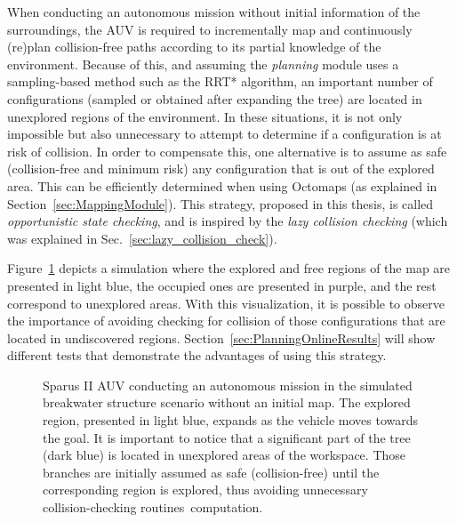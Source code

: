 When conducting an autonomous mission without initial information of the
surroundings, the \ac{AUV} is required to incrementally map and continuously
(re)plan collision-free paths according to its partial knowledge of the
environment. Because of this, and assuming the \textit{planning} module uses a
sampling-based method such as the \ac{RRT*} algorithm, an important number of
configurations (sampled or obtained after expanding the tree) are located in
unexplored regions of the environment. In these situations, it is not only
impossible but also unnecessary to attempt to determine if a configuration is at
risk of collision. In order to compensate this, one alternative is to assume as
safe (collision-free and minimum risk) any configuration that is out of the
explored area. This can be efficiently determined when using Octomaps (as
explained in Section~\ref{sec:MappingModule}). This strategy, proposed in this
thesis, is called \textit{opportunistic state checking}, and is inspired by the
\textit{lazy collision checking} (which was explained in
Sec.~\ref{sec:lazy_collision_check}).

Figure~\ref{fig:OpportStateCheck} depicts a simulation where the explored and
free regions of the map are presented in light blue, the occupied ones are
presented in purple, and the rest correspond to unexplored areas. With this
visualization, it is possible to observe the importance of avoiding checking for
collision of those configurations that are located in undiscovered regions.
Section~\ref{sec:PlanningOnlineResults} will show different tests that
demonstrate the advantages of using this strategy.

\begin{figure}[htbp]
\myfloatalign
     \quad
\caption[Opportunistic state checking. An important number of configurations
are located in unexplored regions.]
{Sparus II AUV conducting an autonomous mission in the simulated
breakwater structure scenario without an initial map.
\protect{} The explored region, presented in light
blue, expands as the vehicle moves towards the goal. It is important to notice
that a significant part of the tree (dark blue) is located in unexplored areas
of the workspace. \protect{} Those branches are
initially assumed as safe (collision-free) until the corresponding region is
explored, thus avoiding unnecessary collision-checking routines~computation.}
\label{fig:OpportStateCheck}
\end{figure}


